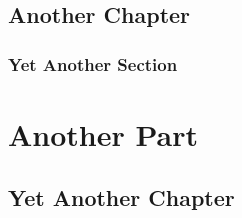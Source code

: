 \documentclass[]{thesis-phd-itt}
\begin{document}
\chapter{Another Chapter}
\lipsum[1] %

\section{Yet Another Section}
\lipsum[1] %

\part{Another Part}

\chapter{Yet Another Chapter}
\lipsum[1] %

\printindex
	
\end{document}
